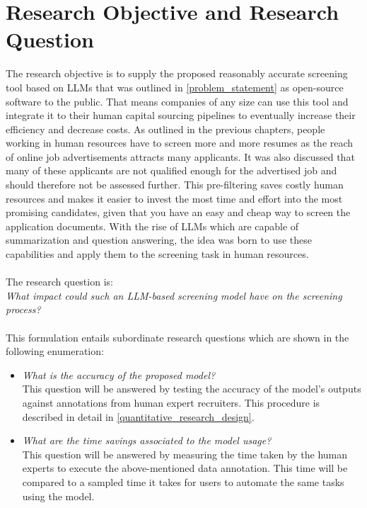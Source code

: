 \documentclass[draft,final]{thesisclass} %
\begin{document}
\section{Research Objective and Research Question} \label{research_objective_and_research_question}
The research objective is to supply the proposed reasonably accurate screening tool based on \acs{LLM}s that was outlined in \ref{problem_statement} as open-source software to the public. 
That means companies of any size can use this tool and integrate it to their human capital sourcing pipelines to eventually increase their efficiency and decrease costs.
As outlined in the previous chapters, people working in human resources have to screen more and more resumes as the reach of online job advertisements attracts many applicants.
It was also discussed that many of these applicants are not qualified enough for the advertised job and should therefore not be assessed further.
This pre-filtering saves costly human resources and makes it easier to invest the most time and effort into the most promising candidates, given that you have an easy and cheap way to screen the application documents.
With the rise of \acs{LLM}s which are capable of summarization and question answering, the idea was born to use these capabilities and apply them to the screening task in human resources.
\\\\
The research question is:\\
\textit{What impact could such an \acs{LLM}-based screening model have on the screening process?}\\\\
This formulation entails subordinate research questions which are shown in the following enumeration:
\begin{itemize}
    \item \textit{What is the accuracy of the proposed model?}\\
    This question will be answered by testing the accuracy of the model's outputs against annotations from human expert recruiters.
    This procedure is described in detail in \ref{quantitative_research_design}.
    \item \textit{What are the time savings associated to the model usage?}\\
    This question will be answered by measuring the time taken by the human experts to execute the above-mentioned data annotation.
    This time will be compared to a sampled time it takes for users to automate the same tasks using the model.
\end{itemize}
\end{document}
